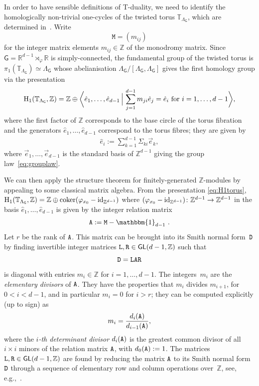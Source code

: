 \documentclass[10pt,a4paper]{amsart}
\numberwithin{equation}{section}
\newcommand{\Z}{\zed}
\newcommand{\unit}{\mathbbm{1}} 			%
\newcommand{\sfG}{\mathsf{G}}
\newcommand{\sfGL}{\mathsf{GL}}
\newcommand{\ttM}{\mathtt{M}}
\newcommand{\zed}{{\mathbb Z}} %
\newcommand{\real}{{\mathbb R}} %
\newcommand{\torus}{{\mathbb T}} %
\begin{document}
In order to have sensible definitions of
T-duality, we need to identify the
homologically non-trivial one-cycles of the twisted torus
$\torus_{\Lambda_\sfG}$, which are determined
in~\cite[Proposition~4.7]{Bock2009}. Write
\[
\ttM = (m_{ij})
\]
for the
integer matrix elements $m_{ij}\in\Z$ of the monodromy matrix. Since
$\sfG=\real^{d-1}\rtimes_\varphi\real$ is simply-connected, the
fundamental group of the twisted torus is
$\pi_1(\torus_{\Lambda_\sfG})\simeq\Lambda_\sfG$ whose abelianisation
$\Lambda_\sfG/[\Lambda_\sfG,\Lambda_\sfG]$ gives
the first homology group via the presentation
\begin{gather}\label{eq:H1torus}
{\rm H}_1(\torus_{\Lambda_\sfG},\zed) = \zed \oplus \bigg\langle
\hat e_1,\dots,\hat e_{d-1} \, \Big| \, \sum_{j=1}^{d-1} m_{ji} \hat
e_j = \hat e_i
\ \mbox{for} \
i=1,\dots,d-1 \bigg\rangle,
\end{gather}
where the first factor of $\zed$ corresponds to the base circle of the
torus fibration and the generators $\hat e_1,\dots,\hat e_{d-1}$
correspond to the torus fibres; they are given by
\begin{gather}\label{eq:hatei}
\hat e_i:=\sum_{k=1}^{d-1} \Sigma_{ki} \vec e_k,
\end{gather}
where
$\vec e_1,\ldots, \vec e_{d-1}$ is the standard basis of $\zed^{d-1}$ giving the
group law~\eqref{eq:grouplaw}.

We can then apply the structure theorem for finitely-generated
$\zed$-modules by appealing to some classical matrix algebra.
From the presentation \eqref{eq:H1torus}, ${\rm
 H}_1(\torus_{\Lambda_\sfG},\zed) = \zed \oplus {\rm{coker}}(\varphi_{x_0}-{\rm{id}}_{\Z^{d-1}})$
where $(\varphi_{x_0}-{\rm{id}}_{\Z^{d-1}})\colon \zed^{d-1}\to\zed^{d-1}$ in the
basis $\hat e_1,\ldots,\hat e_{d-1}$ is given by the integer relation matrix
\begin{gather}\label{eq:relationmatrix}
{\tt A}:=\ttM-\unit_{d-1}~.
\end{gather}
Let $r$ be the rank of $\tt A$. This matrix can be brought into its Smith normal form~$\tt D$
by finding invertible integer matrices ${\tt L}, {\tt
 R}\in\sfGL(d-1,\zed)$ such that
\[
{\tt D} = {\tt L} {\tt A} {\tt R}
\]
is diagonal with entries $m_i\in\zed$ for
$i=1,\dots,d-1$. The
integers~$m_i$ are the \emph{elementary divisors} of
${\tt A}$. They have the properties that $m_i$ divides
$m_{i+1}$, for $0<i<d-1$, and in particular $m_i=0$ for $i>r$; they can
be computed explicitly (up to sign) as
\[
m_i = \frac{d_i({\tt A})}{d_{i-1}({\tt A})},
\]
where the \emph{$i$-th determinant divisor} $d_i({\tt A})$ is the greatest common
divisor of all $i{\times} i$ minors of the relation matrix ${\tt A}$,
with $d_0({\tt A}):=1$. The matrices ${\tt L}, {\tt
 R}\in\sfGL(d-1,\zed)$ are found by reducing the matrix ${\tt A}$ to
its Smith normal form ${\tt D}$ through a sequence of elementary row
and column operations over~$\zed$, see, e.g.,~\cite{Havas1997}.
\end{document}
